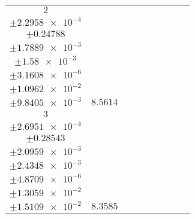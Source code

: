 \documentclass[8pt]{article}
\begin{document}
\begin{longtable}[l]{c c c c c c c c c}
$\num{2}$ & \begin{tabular}[c]{@{}c@{}}$\num{5.374e-2}$ \\ $\pm\num{2.2958e-4}$\end{tabular} & \begin{tabular}[c]{@{}c@{}}$\num{-1.2103e-2}$ \\ $\pm\num{0.24788}$\end{tabular} & \begin{tabular}[c]{@{}c@{}}$\num{-3.837}$ \\ $\pm\num{1.7889e-3}$\end{tabular} & \begin{tabular}[c]{@{}c@{}}$\num{2.0274e+3}$ \\ $\pm\num{1.58e-3}$\end{tabular} & \begin{tabular}[c]{@{}c@{}}$\num{4.056}$ \\ $\pm\num{3.1608e-6}$\end{tabular} & \begin{tabular}[c]{@{}c@{}}$\num{2.22}$ \\ $\pm\num{1.0962e-2}$\end{tabular} & \begin{tabular}[c]{@{}c@{}}$\num{1.9003}$ \\ $\pm\num{9.8405e-3}$\end{tabular} & $\num{8.5614}$\\
$\num{3}$ & \begin{tabular}[c]{@{}c@{}}$\num{5.4659e-2}$ \\ $\pm\num{2.6951e-4}$\end{tabular} & \begin{tabular}[c]{@{}c@{}}$\num{0.66842}$ \\ $\pm\num{0.28543}$\end{tabular} & \begin{tabular}[c]{@{}c@{}}$\num{3.8343}$ \\ $\pm\num{2.0959e-3}$\end{tabular} & \begin{tabular}[c]{@{}c@{}}$\num{2.0351e+3}$ \\ $\pm\num{2.4348e-3}$\end{tabular} & \begin{tabular}[c]{@{}c@{}}$\num{4.0713}$ \\ $\pm\num{4.8709e-6}$\end{tabular} & \begin{tabular}[c]{@{}c@{}}$\num{2.2592}$ \\ $\pm\num{1.3059e-2}$\end{tabular} & \begin{tabular}[c]{@{}c@{}}$\num{2.6052}$ \\ $\pm\num{1.5109e-2}$\end{tabular} & $\num{8.3585}$\\

\end{longtable}
\end{document}
